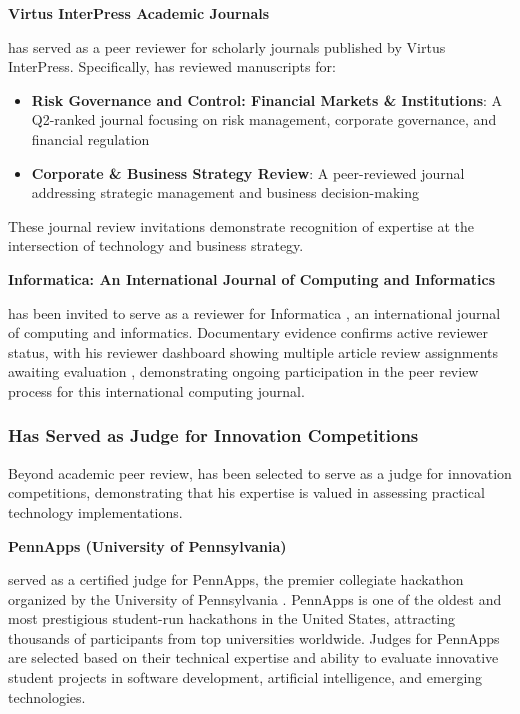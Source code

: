 \textbf{Virtus InterPress Academic Journals}

\dr has served as a peer reviewer for scholarly journals published by Virtus InterPress. Specifically, \dr has reviewed manuscripts for:

\begin{itemize}
    \item \textbf{Risk Governance and Control: Financial Markets \& Institutions}: A Q2-ranked journal focusing on risk management, corporate governance, and financial regulation \cite{JR14}
    \item \textbf{Corporate \& Business Strategy Review}: A peer-reviewed journal addressing strategic management and business decision-making \cite{JR15}
\end{itemize}

These journal review invitations demonstrate recognition of \drs expertise at the intersection of technology and business strategy.

\textbf{Informatica: An International Journal of Computing and Informatics}

\dr has been invited to serve as a reviewer for Informatica \cite{JR16}, an international journal of computing and informatics. Documentary evidence confirms \drs active reviewer status, with his reviewer dashboard showing multiple article review assignments awaiting evaluation \cite{JR21}, demonstrating ongoing participation in the peer review process for this international computing journal.


\subsubsection{\dr Has Served as Judge for Innovation Competitions}
\label{judge:competitions}

Beyond academic peer review, \dr has been selected to serve as a judge for innovation competitions, demonstrating that his expertise is valued in assessing practical technology implementations.

\textbf{PennApps (University of Pennsylvania)}

\dr served as a certified judge for PennApps, the premier collegiate hackathon organized by the University of Pennsylvania \cite{JR17}. PennApps is one of the oldest and most prestigious student-run hackathons in the United States, attracting thousands of participants from top universities worldwide. Judges for PennApps are selected based on their technical expertise and ability to evaluate innovative student projects in software development, artificial intelligence, and emerging technologies.

